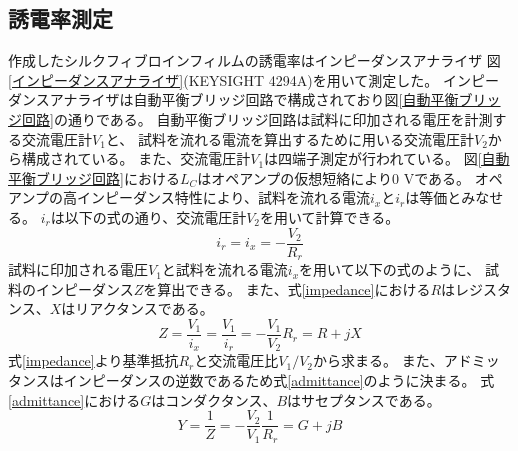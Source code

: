 \documentclass[dvipdfmx,12pt,a4paper]{jreport}
\begin{document}
			\subsection{誘電率測定}
			作成したシルクフィブロインフィルムの誘電率はインピーダンスアナライザ
			図\ref{インピーダンスアナライザ}(KEYSIGHT 4294A)を用いて測定した。
			インピーダンスアナライザは自動平衡ブリッジ回路で構成されており図\ref{自動平衡ブリッジ回路}の通りである。
			自動平衡ブリッジ回路は試料に印加される電圧を計測する交流電圧計$V_1$と、
			試料を流れる電流を算出するために用いる交流電圧計$V_2$から構成されている。
			また、交流電圧計$V_1$は四端子測定が行われている。
			図\ref{自動平衡ブリッジ回路}における$L_C$はオペアンプの仮想短絡により0 Vである。
			オペアンプの高インピーダンス特性により、試料を流れる電流$i_x$と$i_r$は等価とみなせる。
			$i_r$は以下の式の通り、交流電圧計$V_2$を用いて計算できる。
			\begin{equation}
				i_r=i_x=-\frac{V_2}{R_r}
			\end{equation}
			試料に印加される電圧$V_1$と試料を流れる電流$i_x$を用いて以下の式のように、
			試料のインピーダンス$Z$を算出できる。
			また、式\ref{impedance}における$R$はレジスタンス、$X$はリアクタンスである。
			\begin{equation}
				Z=\frac{V_1}{i_x}=\frac{V_1}{i_r}=-\frac{V_1}{V_2}R_r = R + j X  
				\label{impedance}
			\end{equation}
			式\ref{impedance}より基準抵抗$R_r$と交流電圧比$V_1/V_2$から求まる。
			また、アドミッタンスはインピーダンスの逆数であるため式\ref{admittance}のように決まる。
			式\ref{admittance}における$G$はコンダクタンス、$B$はサセプタンスである。
			\begin{equation}
				Y= \frac{1}{Z}=-\frac{V_2}{V_1}\frac{1}{R_r} = G + j B
				\label{admittance}
			\end{equation}
\end{document}

